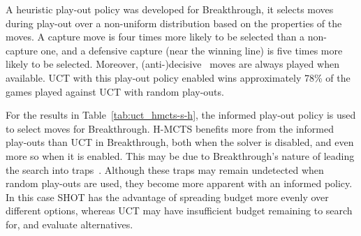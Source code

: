 \documentclass{icga}
\begin{document}
A heuristic play-out policy was developed for Breakthrough, it selects moves during play-out over a non-uniform distribution based on the properties of the moves. A capture move is four times more likely to be selected than a non-capture one, and a defensive capture (near the winning line) is five times more likely to be selected. Moreover, (anti-)decisive~\cite{teytaud2010huge} moves are always played when available. UCT with this play-out policy enabled wins approximately 78\% of the games played against UCT with random play-outs. 

For the results in Table~\ref{tab:uct_hmcts-s-h}, the informed play-out policy is used to select moves for Breakthrough. H-MCTS benefits more from the informed play-outs than UCT in Breakthrough, both when the solver is disabled, and even more so when it is enabled. This may be due to Breakthrough's nature of leading the search into traps~\cite{Ramanujan2010a}. Although these traps may remain undetected when random play-outs are used, they become more apparent with an informed policy. In this case SHOT has the advantage of spreading budget more evenly over different options, whereas UCT may have insufficient budget remaining to search for, and evaluate alternatives.


\end{document}
